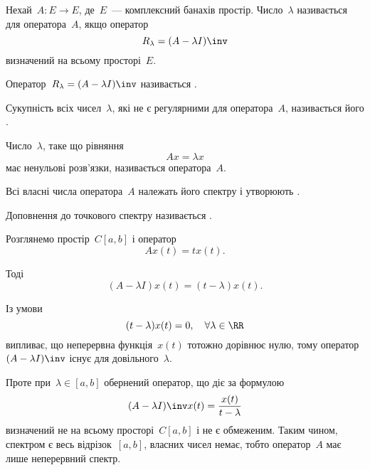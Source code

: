 \begin{definition}
Нехай~$A: E \to E$, де~$E$~--- комплексний банахів простір.
Число~$\lambda$ називається  для
оператора~$A$, якщо оператор
\begin{equation*}
    R_\lambda = (A - \lambda I)\inv
\end{equation*}
визначений на всьому просторі~$E$.
\end{definition}

\begin{definition}
Оператор~$R_\lambda = (A - \lambda I)\inv$ називається
.
\end{definition}

\begin{definition}
Сукупність всіх чисел~$\lambda$, які не є регулярними
для оператора~$A$, називається його .
\end{definition}

\begin{definition}
Число~$\lambda$, таке що рівняння
\begin{equation*}
    Ax = \lambda x
\end{equation*}
має ненульові розв’язки,
називається  оператора~$A$.
\end{definition}

\begin{definition}
Всі власні числа оператора~$A$ належать його
спектру і утворюють .
\end{definition}

\begin{definition}
Доповнення до точкового спектру
називається .
\end{definition}

\begin{example}
Розглянемо простір~$C[a, b]$ і оператор
\begin{equation*}
    A x(t) = t x(t).
\end{equation*}

Тоді
\begin{equation*}
    (A - \lambda I) x(t) = (t - \lambda) x(t).
\end{equation*}

Із умови
\begin{equation*}
    (t - \lambda) x(t) = 0, \quad \forall \lambda \in \RR
\end{equation*}
випливає, що неперервна функція~$x(t)$ тотожно дорівнює
нулю, тому оператор~$(A - \lambda I)\inv$ існує для довільного~$\lambda$.

Проте при~$\lambda \in [a, b]$ обернений оператор, що діє за
формулою
\begin{equation*}
    (A - \lambda I)\inv x(t) = \frac{x(t)}{t - \lambda}
\end{equation*}
визначений не на всьому просторі~$C[a, b]$ і не є
обмеженим. Таким чином, спектром є весь відрізок~$[a, b]$,
власних чисел немає, тобто оператор~$A$ має лише
неперервний спектр.
\end{example}

